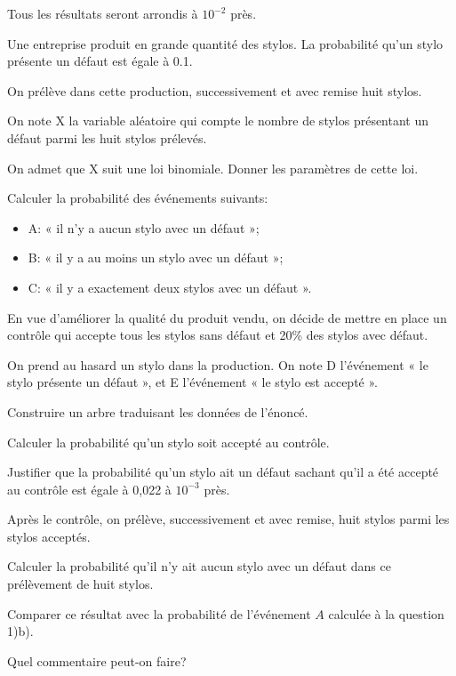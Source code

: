 
Tous les résultats seront arrondis à $10^{-2}$ près.

Une entreprise produit en grande quantité des stylos. La probabilité qu'un stylo présente un défaut est égale à 0.1.

\question{} On prélève dans cette production, successivement et avec remise huit stylos.

On note X la variable aléatoire qui compte le nombre de stylos présentant un défaut parmi les huit stylos prélevés.

\subquestion{} On admet que X suit une loi binomiale. Donner les paramètres de cette loi.

\subquestion{} Calculer la probabilité des événements suivants:

\begin{itemize}
\item A: « il n'y a aucun stylo avec un défaut »;

\item B: « il y a au moins un stylo avec un défaut »;

\item C: « il y a exactement deux stylos avec un défaut ».
\end{itemize}

\question{} En vue d'améliorer la qualité du produit vendu, on décide de mettre en place un contrôle qui accepte tous les stylos sans défaut et 20\% des stylos avec défaut.

On prend au hasard un stylo dans la production. On note D l'événement « le stylo présente un défaut », et E l'événement « le stylo est accepté ».

\subquestion{} Construire un arbre traduisant les données de l'énoncé.

\subquestion{} Calculer la probabilité qu'un stylo soit accepté au contrôle.

\subquestion{} Justifier que la probabilité qu'un stylo ait un défaut sachant qu'il a été accepté au contrôle est égale à 0,022 à $10^{-3}$ près.

\question{} Après le contrôle, on prélève, successivement et avec remise, huit stylos parmi les stylos acceptés.

Calculer la probabilité qu'il n'y ait aucun stylo avec un défaut dans ce prélèvement de huit stylos.

Comparer ce résultat avec la probabilité de l'événement $A$ calculée à la question 1)b).

Quel commentaire peut-on faire?